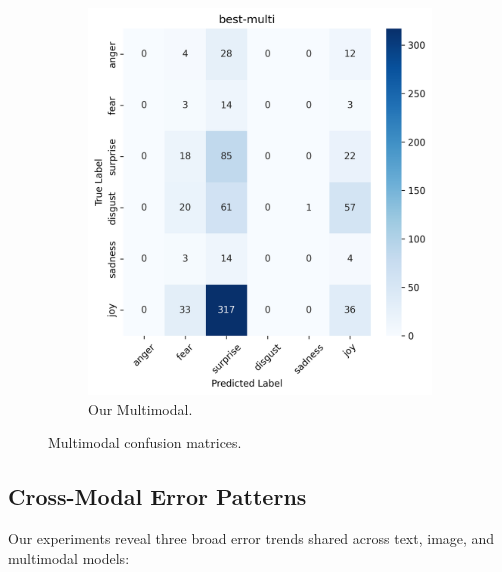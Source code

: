 \begin{figure}[ht]
\begin{subfigure}[b]{0.48\textwidth}
        \includegraphics[width=\textwidth]{images/confusion_matrix_best_multi_dist.png}
        \caption{Our Multimodal.}
        \label{fig:multi-confusion-best}
    \end{subfigure}
    \caption{Multimodal confusion matrices.}
    \label{fig:multi-confusion}
\end{figure}

\subsection{Cross-Modal Error Patterns}
\label{subsec:cross-modal}

Our experiments reveal three broad error trends shared across text, image, and multimodal models:

